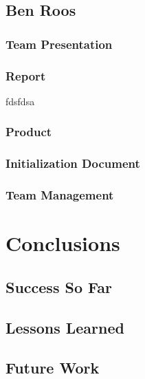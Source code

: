 \documentclass[12pt]{article}
\begin{document}
\begin{spacing}{1.5}
\subsection{Ben Roos}
\subsubsection{Team Presentation}
\subsubsection{Report}
fdsfdsa
\subsubsection{Product}
\subsubsection{Initialization Document}
\subsubsection{Team Management}



\section{Conclusions}
\subsection{Success So Far}
\subsection{Lessons Learned}
\subsection{Future Work}


\end{spacing}
\end{document}
